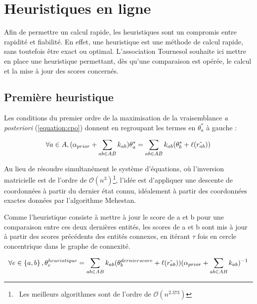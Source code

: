 \section{Heuristiques en ligne}
Afin de permettre un calcul rapide, les heuristiques sont un compromis entre rapidité et fiabilité. En effet, une heuristique est une méthode de calcul rapide, sans toutefois être exact ou optimal. L'association Tournesol souhaite ici mettre en place une heuristique permettant, dès qu'une comparaison est opérée, le calcul et la mise à jour des scores concernés.

\subsection{Première heuristique}

Les conditions du premier ordre de la maximisation de la vraisemblance \textit{a posteriori} (\ref{equation:cpo}) donnent en regroupant les termes en $\theta^{*}_a$ à gauche :

\begin{equation}
 \forall a \in A,   (\alpha_{prior} + \sum_{ab \in AB} k_{ab}) \theta^{*}_a = \sum_{ab \in AB} k_{ab}(\theta^{*}_b + \ell(\Tilde{r_{ab}}))
\end{equation}

Au lieu de résoudre simultanément le système d'équations, où l'inversion matricielle est de l'ordre de $\mathcal{O}(n^3)$\footnote{~Les meilleurs algorithmes sont de l'ordre de $\mathcal{O}(n^{2.373})$}, l'idée est d'appliquer une descente de coordonnées à partir du dernier état connu, idéalement à partir des coordonnées exactes données par l'algorithme Mehestan. 

Comme l'heuristique consiste à mettre à jour le score de a et b pour une comparaison entre ces deux dernières entités, les scores de a et b sont mis à jour à partir des scores précédents des entités connexes, en itérant $\tau$ fois en cercle concentrique dans le graphe de connexité.

\begin{equation}
  \forall e \in \left\lbrace a,b \right\rbrace, \theta^{heuristique}_e = \sum_{ab \in AB} k_{ab}(\theta^{dernier score}_b + \ell(\Tilde{r_{ab}})) (\alpha_{prior} + \sum_{ab \in AB} k_{ab})^{-1}
\end{equation}

\pagebreak

